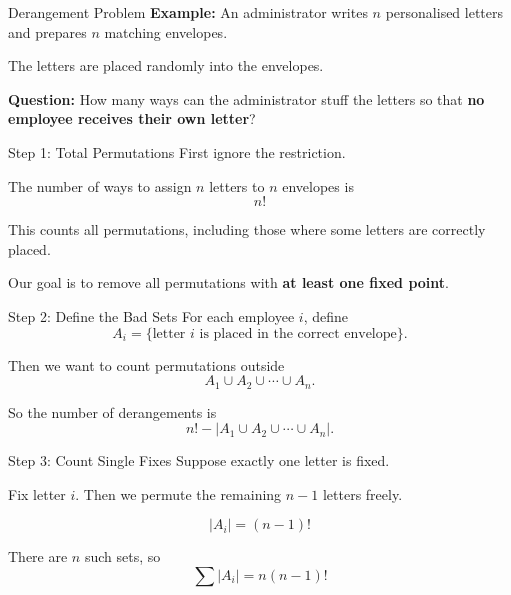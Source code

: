 \begin{frame}{Derangement Problem}
  \textcolor{sqt-question}{
    \textbf{Example:}
    An administrator writes $n$ personalised letters and prepares $n$ matching envelopes.
  }

  \vspace{0.5em}

  The letters are placed randomly into the envelopes.

  \vspace{0.5em}

  \textbf{Question:}
  How many ways can the administrator stuff the letters so that \textbf{no employee receives their own letter}?
\end{frame}

\begin{frame}{Step 1: Total Permutations}
  First ignore the restriction.

  \vspace{0.5em}

  The number of ways to assign $n$ letters to $n$ envelopes is
  \[
    n!
  \]

  \vspace{0.5em}

  This counts all permutations, including those where some letters are correctly placed.

  \vspace{0.5em}

  Our goal is to remove all permutations with \textbf{at least one fixed point}.
\end{frame}

\begin{frame}{Step 2: Define the Bad Sets}
  For each employee $i$, define
  \[
    A_i = \{\text{letter $i$ is placed in the correct envelope}\}.
  \]

  \vspace{0.5em}

  Then we want to count permutations outside
  \[
    A_1 \cup A_2 \cup \cdots \cup A_n.
  \]

  \vspace{0.5em}

  So the number of derangements is
  \[
    n! - |A_1 \cup A_2 \cup \cdots \cup A_n|.
  \]
\end{frame}

\begin{frame}{Step 3: Count Single Fixes}
  Suppose exactly one letter is fixed.

  \vspace{0.5em}

  Fix letter $i$. Then we permute the remaining $n-1$ letters freely.

  \[
    |A_i| = (n-1)!
  \]

  \vspace{0.5em}

  There are $n$ such sets, so
  \[
    \sum |A_i| = n (n-1)!
  \]
\end{frame}

